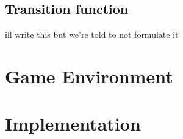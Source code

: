 \documentclass{article}
\begin{document}
\subsection{Transition function} 
ill write this but we're told to not formulate it


\section{Game Environment}

\section{Implementation}
\end{document}
